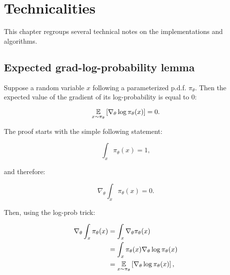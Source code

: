 \chapter{Technicalities}

This chapter regroups several technical notes on the implementations and algorithms.

\section{Expected grad-log-probability lemma}

Suppose a random variable $x$ following a parameterized p.d.f. $\pi_\theta$. Then the expected value of the gradient of its log-probability is equal to $0$:

\begin{equation}
\label{eq:eglp}
	\underset{x \sim \pi_\theta}{\mathbb{E}} \left[ \nabla_\theta \log \pi_\theta(x) \right] = 0.
\end{equation}

The proof starts with the simple following statement:

\begin{equation*}
	\int_x \pi_\theta(x) = 1,
\end{equation*}

and therefore:

\begin{equation*}
	\nabla_\theta \int_x \pi_\theta(x) = 0.
\end{equation*}

Then, using the log-prob trick:

\begin{equation*}
\begin{aligned}
	\nabla_\theta \int_x \pi_\theta(x) 	&= \int_x \nabla_\theta \pi_\theta(x)\\
								&= \int_x \pi_\theta(x) \nabla_\theta \log \pi_\theta(x)\\
								&= \underset{x \sim \pi_\theta}{\mathbb{E}} \left[ \nabla_\theta \log \pi_\theta(x) \right],
\end{aligned}
\end{equation*}

